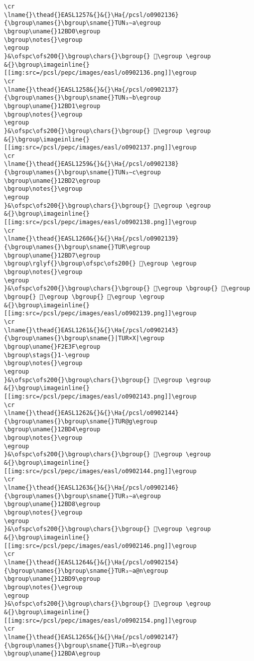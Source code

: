 \begin{verbatim}
\cr
\lname{}\thead{}EASL1257&{}&{}\Ha{/pcsl/o0902136}{\bgroup\names{}\bgroup\sname{}TUN₃∼a\egroup
\bgroup\uname{}12BD0\egroup
\bgroup\notes{}\egroup
\egroup
}&\ofspc\ofs200{}\bgroup\chars{}\bgroup{} 𒯐\egroup \egroup
&{}\bgroup\imageinline{}[[img:src=/pcsl/pepc/images/easl/o0902136.png]]\egroup
\cr
\lname{}\thead{}EASL1258&{}&{}\Ha{/pcsl/o0902137}{\bgroup\names{}\bgroup\sname{}TUN₃∼b\egroup
\bgroup\uname{}12BD1\egroup
\bgroup\notes{}\egroup
\egroup
}&\ofspc\ofs200{}\bgroup\chars{}\bgroup{} 𒯑\egroup \egroup
&{}\bgroup\imageinline{}[[img:src=/pcsl/pepc/images/easl/o0902137.png]]\egroup
\cr
\lname{}\thead{}EASL1259&{}&{}\Ha{/pcsl/o0902138}{\bgroup\names{}\bgroup\sname{}TUN₃∼c\egroup
\bgroup\uname{}12BD2\egroup
\bgroup\notes{}\egroup
\egroup
}&\ofspc\ofs200{}\bgroup\chars{}\bgroup{} 𒯒\egroup \egroup
&{}\bgroup\imageinline{}[[img:src=/pcsl/pepc/images/easl/o0902138.png]]\egroup
\cr
\lname{}\thead{}EASL1260&{}&{}\Ha{/pcsl/o0902139}{\bgroup\names{}\bgroup\sname{}TUR\egroup
\bgroup\uname{}12BD7\egroup
\bgroup\rglyf{}\bgroup\ofspc\ofs200{} 𒯗\egroup \egroup
\bgroup\notes{}\egroup
\egroup
}&\ofspc\ofs200{}\bgroup\chars{}\bgroup{} 𒯓\egroup \bgroup{} 𒯕\egroup \bgroup{} 𒯖\egroup \bgroup{} 𒯗\egroup \egroup
&{}\bgroup\imageinline{}[[img:src=/pcsl/pepc/images/easl/o0902139.png]]\egroup
\cr
\lname{}\thead{}EASL1261&{}&{}\Ha{/pcsl/o0902143}{\bgroup\names{}\bgroup\sname{}|TUR×X|\egroup
\bgroup\uname{}F2E3F\egroup
\bgroup\stags{}1-\egroup
\bgroup\notes{}\egroup
\egroup
}&\ofspc\ofs200{}\bgroup\chars{}\bgroup{} 󲸿\egroup \egroup
&{}\bgroup\imageinline{}[[img:src=/pcsl/pepc/images/easl/o0902143.png]]\egroup
\cr
\lname{}\thead{}EASL1262&{}&{}\Ha{/pcsl/o0902144}{\bgroup\names{}\bgroup\sname{}TUR@g\egroup
\bgroup\uname{}12BD4\egroup
\bgroup\notes{}\egroup
\egroup
}&\ofspc\ofs200{}\bgroup\chars{}\bgroup{} 𒯔\egroup \egroup
&{}\bgroup\imageinline{}[[img:src=/pcsl/pepc/images/easl/o0902144.png]]\egroup
\cr
\lname{}\thead{}EASL1263&{}&{}\Ha{/pcsl/o0902146}{\bgroup\names{}\bgroup\sname{}TUR₃∼a\egroup
\bgroup\uname{}12BD8\egroup
\bgroup\notes{}\egroup
\egroup
}&\ofspc\ofs200{}\bgroup\chars{}\bgroup{} 𒯘\egroup \egroup
&{}\bgroup\imageinline{}[[img:src=/pcsl/pepc/images/easl/o0902146.png]]\egroup
\cr
\lname{}\thead{}EASL1264&{}&{}\Ha{/pcsl/o0902154}{\bgroup\names{}\bgroup\sname{}TUR₃∼a@n\egroup
\bgroup\uname{}12BD9\egroup
\bgroup\notes{}\egroup
\egroup
}&\ofspc\ofs200{}\bgroup\chars{}\bgroup{} 𒯙\egroup \egroup
&{}\bgroup\imageinline{}[[img:src=/pcsl/pepc/images/easl/o0902154.png]]\egroup
\cr
\lname{}\thead{}EASL1265&{}&{}\Ha{/pcsl/o0902147}{\bgroup\names{}\bgroup\sname{}TUR₃∼b\egroup
\bgroup\uname{}12BDA\egroup

\end{verbatim}
